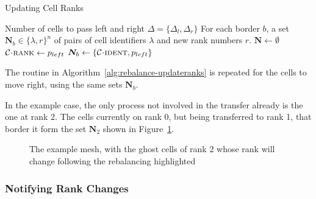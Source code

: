 \documentclass[twoside]{IIBproject}
\newcommand{\vect} [1] {\bm{#1}}
\newcommand{\acc}{{\mkern 0.5mu\cdot\mkern 0.5mu}}
\numberwithin{figure}{section}
\begin{document}
            \begin{algorithm}[H]
                \caption{Updating Cell Ranks}
                \label{alg:rebalance-updateranks}

                \begin{algorithmic}
                    \Require Number of cells to pass left and right $\Delta = \{\Delta_l,\Delta_r\}$
                    \Ensure For each border $b$, a set $\vect{N}_b \in \{\lambda,r\}^n$ of pairs of cell identifiers $\lambda$ and new rank numbers $r$.
                    \Statex
                    \State $\vect{N} \gets \emptyset$
                        \State $\mathcal{C} \acc \textproc{rank} \gets p_{left}$
                                \State $\vect{N}_b \gets \{\mathcal{C} \acc \textproc{ident} , p_{left}\}$
                            \EndIf
                        \EndFor
                    \EndFor
                \end{algorithmic}
            \end{algorithm}

            The routine in Algorithm~\ref{alg:rebalance-updateranks} is repeated for the cells to move right, using the same sets $\vect{N}_b$.

            In the example case, the only process not involved in the transfer already is the one at rank 2. The cells currently on rank 0, but being transferred to rank 1, that border it form the set $\vect{N}_2$ shown in Figure~\ref{fig:rebalance-notify}.

            \begin{figure}[H]
                
                \caption{The example mesh, with the ghost cells of rank 2 whose rank will change following the rebalancing highlighted}
                \label{fig:rebalance-notify}
            \end{figure}



        \subsubsection{Notifying Rank Changes} %
            \label{sec:rebalancing-notifyrank}
\end{document}
